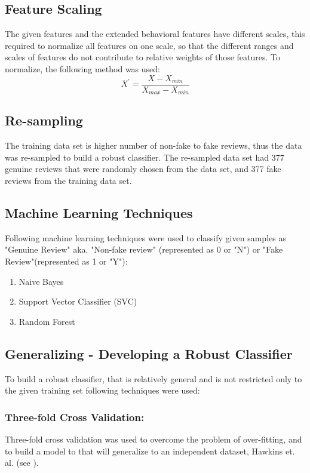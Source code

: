 \documentclass{llncs}
\begin{document}
\subsection{Feature Scaling}
The given features and the extended behavioral features have different scales, this required to normalize all features on one scale, so that the different ranges and scales of features do not contribute to relative weights of those features. To normalize, the following method was used:
\[ X^{'} =\frac{X - X_{min}}{X_{max} - X_{min}}   \]
\subsection{Re-sampling}
The training data set is higher number of non-fake to fake reviews, thus the data was re-sampled to build a robust classifier. The re-sampled data set had 377 genuine reviews that were randomly chosen from the data set, and 377 fake reviews from the training data set.

\subsection{Machine Learning Techniques}
Following machine learning techniques were used to classify given samples as "Genuine Review" aka. "Non-fake review" (represented as 0 or "N") or "Fake Review"(represented as 1 or "Y"):
\begin{enumerate}
   \item Naive Bayes
   \item Support Vector Classifier (SVC)
   \item Random Forest
 \end{enumerate}
 
\subsection{Generalizing - Developing a Robust Classifier}
To build a robust classifier, that is relatively general and is not restricted only to the given training set following techniques were used:

\subsubsection{Three-fold Cross Validation:} Three-fold cross validation was used to overcome the problem of over-fitting, and to build a model to that will generalize to an independent dataset, Hawkins et. al. (see \cite{hawkins:eke}).  
\end{document}
